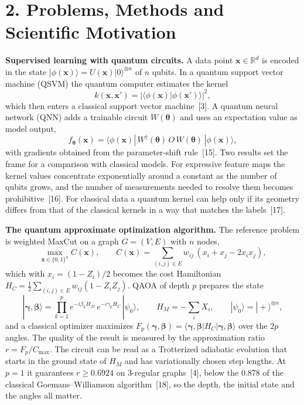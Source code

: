 \documentclass[12pt,a4paper]{article}
\begin{document}
\section*{2. Problems, Methods and Scientific Motivation}

\textbf{Supervised learning with quantum circuits.}  A data point
$\boldsymbol x\in\mathbb R^d$ is encoded in the state
$|\phi(\boldsymbol x)\rangle=U(\boldsymbol x)|0\rangle^{\otimes n}$ of
$n$ qubits.  In a quantum support vector machine (QSVM) the quantum
computer estimates the kernel
\[
  k(\boldsymbol x,\boldsymbol x')
  =\bigl|\langle\phi(\boldsymbol x)|\phi(\boldsymbol x')\rangle\bigr|^2 ,
\]
which then enters a classical support vector machine~[3].  A quantum
neural network (QNN) adds a trainable circuit $W(\boldsymbol\theta)$
and uses an expectation value as model output,
\[
  f_{\boldsymbol\theta}(\boldsymbol x)
  =\langle\phi(\boldsymbol x)|\,W^\dagger(\boldsymbol\theta)\,O\,
  W(\boldsymbol\theta)\,|\phi(\boldsymbol x)\rangle ,
\]
with gradients obtained from the parameter-shift rule~[15].  Two
results set the frame for a comparison with classical models.  For
expressive feature maps the kernel values concentrate exponentially
around a constant as the number of qubits grows, and the number of
measurements needed to resolve them becomes prohibitive~[16].  For
classical data a quantum kernel can help only if its geometry differs
from that of the classical kernels in a way that matches the
labels~[17].

\textbf{The quantum approximate optimization algorithm.}  The
reference problem is weighted MaxCut on a graph $G=(V,E)$ with $n$
nodes,
\[
  \max_{\boldsymbol x\in\{0,1\}^n} C(\boldsymbol x),\qquad
  C(\boldsymbol x)=\sum_{(i,j)\in E}w_{ij}\,(x_i+x_j-2x_ix_j) ,
\]
which with $x_i=(1-Z_i)/2$ becomes the cost Hamiltonian
$H_C=\tfrac12\sum_{(i,j)\in E}w_{ij}(1-Z_iZ_j)$.  QAOA of depth $p$
prepares the state
\[
  |\boldsymbol\gamma,\boldsymbol\beta\rangle
  =\prod_{k=1}^{p}e^{-i\beta_kH_M}\,e^{-i\gamma_kH_C}\,|\psi_0\rangle ,
  \qquad H_M=-\sum_{i}X_i,\qquad |\psi_0\rangle=|+\rangle^{\otimes n},
\]
and a classical optimizer maximizes
$F_p(\boldsymbol\gamma,\boldsymbol\beta)=\langle\boldsymbol\gamma,\boldsymbol\beta|H_C|\boldsymbol\gamma,\boldsymbol\beta\rangle$
over the $2p$ angles.  The quality of the result is measured by the
approximation ratio $r=F_p/C_{\max}$.  The circuit can be read as a
Trotterized adiabatic evolution that starts in the ground state of
$H_M$ and has variationally chosen step lengths.  At $p=1$ it
guarantees $r\ge 0.6924$ on 3-regular graphs~[4], below the $0.878$ of
the classical Goemans--Williamson algorithm~[18], so the depth, the
initial state and the angles all matter.
\end{document}
